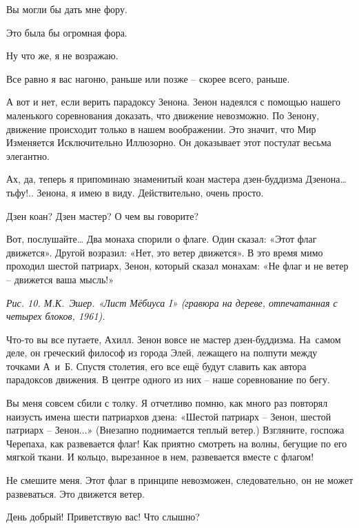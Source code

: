 \documentclass[../main.tex]{subfiles}
\begin{document}
\begin{dialogue}
 Вы могли бы дать мне фору.

 Это была бы огромная фора.

 Ну что же, я не возражаю.

 Все равно я вас нагоню, раньше или позже \--- скорее всего, раньше.

 А вот и нет, если верить парадоксу Зенона. Зенон надеялся с помощью нашего маленького соревнования доказать, что движение невозможно. По Зенону, движение происходит только в нашем воображении. Это значит, что Мир Изменяется Исключительно Иллюзорно. Он доказывает этот постулат весьма элегантно.

 Ах, да, теперь я припоминаю знаменитый коан мастера дзен-буддизма Дзенона\ldots{} тьфу!.. Зенона, я имею в виду. Действительно, очень просто.

 Дзен коан? Дзен мастер? О чем вы говорите?

 Вот, послушайте\ldots{} Два монаха спорили о флаге. Один сказал: «Этот флаг движется». Другой возразил: «Нет, это ветер движется». В это время мимо проходил шестой патриарх, Зенон, который сказал монахам: «Не флаг и не ветер \--- движется ваша мысль!»

\emph{Рис. 10. М.К.~Эшер. «Лист Мёбиуса I» (гравюра на дереве, отпечатанная с четырех блоков, 1961).}

 Что-то вы все путаете, Ахилл. Зенон вовсе не мастер дзен-буддизма. На~самом деле, он греческий философ из города Элей, лежащего на полпути между точками А~и~Б. Спустя столетия, его все ещё будут славить как автора парадоксов движения. В центре одного из них \--- наше соревнование по бегу.

 Вы меня совсем сбили с толку. Я отчетливо помню, как много раз повторял наизусть имена шести патриархов дзена: «Шестой патриарх \--- Зенон, шестой патриарх \--- Зенон...» (Внезапно поднимается теплый ветер.) Взгляните, госпожа Черепаха, как развевается флаг! Как приятно смотреть на волны, бегущие по его мягкой ткани. И кольцо, вырезанное в нем, развевается вместе с флагом!

 Не смешите меня. Этот флаг в принципе невозможен, следовательно, он не может развеваться. Это движется ветер.


 День добрый! Приветствую вас! Что слышно?


\end{dialogue}
\end{document}
